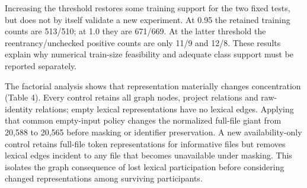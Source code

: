 \documentclass[preprint,12pt]{elsarticle}
\begin{document}
Increasing the threshold restores some training support for the two fixed tests, but does not by itself validate a new experiment. At 0.95 the retained training counts are 513/510; at 1.0 they are 671/669. At the latter threshold the reentrancy/unchecked positive counts are only 11/9 and 12/8. These results explain why numerical train-size feasibility and adequate class support must be reported separately.

The factorial analysis shows that representation materially changes concentration (Table 4). Every control retains all graph nodes, project relations and raw-identity relations; empty lexical representations have no lexical edges. Applying that common empty-input policy changes the normalized full-file giant from 20,588 to 20,565 before masking or identifier preservation. A new availability-only control retains full-file token representations for informative files but removes lexical edges incident to any file that becomes unavailable under masking. This isolates the graph consequence of lost lexical participation before considering changed representations among surviving participants.
\end{document}
